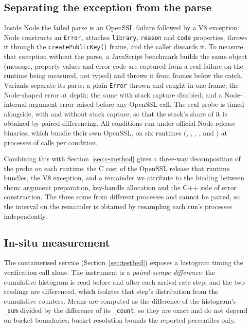 \documentclass[preprint,12pt,authoryear]{elsarticle}
\begin{document}
\subsection{Separating the exception from the parse}

Inside Node the failed parse is an OpenSSL failure followed by a V8 exception:
Node constructs an \texttt{Error}, attaches \texttt{library}, \texttt{reason}
and \texttt{code} properties, throws it through the \texttt{createPublicKey()}
frame, and the caller discards it. To measure that exception without the
parse, a JavaScript benchmark builds the same object (message, property
values and error code are captured from a real failure on the runtime being
measured, not typed) and throws it from \ExcDepth{} frames below the catch.
Variants separate its parts: a plain \texttt{Error} thrown and caught in one
frame; the Node-shaped error at depth; the same with stack capture disabled;
and a Node-internal argument error raised before any OpenSSL call. The real
probe is timed alongside, with and without stack capture, so that the stack's
share of it is obtained by paired differencing. All conditions run under
official Node release binaries, which bundle their own OpenSSL, on six
runtimes (\RtEighteenLiteral, \RtTwentyLiteral, \RtTwentyTwoLiteral,
\RtTwentyThreeLiteral, \RtTwentyFourLiteral{} and \RtTwentySixLiteral{}) at
\ExcInvocations{} processes of \ExcCallsPerInvocation{} calls per condition.

Combining this with Section~\ref{sec:c-method} gives a three-way decomposition
of the probe on each runtime: the C cost of the OpenSSL release that runtime
bundles, the V8 exception, and a remainder we attribute to the binding between
them: argument preparation, key-handle allocation and the C++ side of error
construction. The three come from different processes and cannot be paired, so
the interval on the remainder is obtained by resampling each run's processes
independently.

\subsection{In-situ measurement}

The containerised service (Section~\ref{sec:testbed}) exposes a histogram timing the verification call alone. The
instrument is a \emph{paired-scrape difference}: the cumulative histogram is read
before and after each arrival-rate step, and the two readings are differenced,
which isolates that step's distribution from the cumulative counters. Means are
computed as the difference of the histogram's \texttt{\_sum} divided by the
difference of its \texttt{\_count}, so they are exact and do not depend on bucket
boundaries; bucket resolution bounds the reported percentiles only.
\end{document}
